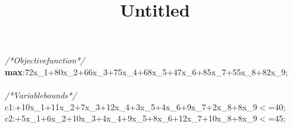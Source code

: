 \documentclass[a4paper, 10pt]{article}
\title{Untitled}
\newcommand\SPC{\hspace*{0.6em}}
\newcommand{\LPHighlighterAComment}[1]{\textit{\textcolor[rgb]{0,0.5,0}{#1}}}
\newcommand{\LPHighlighterAIdentifier}[1]{#1}
\newcommand{\LPHighlighterANumber}[1]{\textcolor[rgb]{0,0,0.5}{#1}}
\newcommand{\LPHighlighterAReservedWord}[1]{\textbf{#1}}
\newcommand{\LPHighlighterASpace}[1]{#1}
\newcommand{\LPHighlighterASymbol}[1]{#1}
\begin{document}
\begin{ttfamily}
\noindent
\LPHighlighterAComment{/*\SPC Objective\SPC function\SPC */}\\
\LPHighlighterAReservedWord{max}\LPHighlighterASymbol{:}\LPHighlighterASpace{\SPC }\LPHighlighterANumber{72x}\LPHighlighterAIdentifier{\_1}\LPHighlighterASymbol{+}\LPHighlighterANumber{80x}\LPHighlighterAIdentifier{\_2}\LPHighlighterASymbol{+}\LPHighlighterANumber{66x}\LPHighlighterAIdentifier{\_3}\LPHighlighterASymbol{+}\LPHighlighterANumber{75x}\LPHighlighterAIdentifier{\_4}\LPHighlighterASymbol{+}\LPHighlighterANumber{68x}\LPHighlighterAIdentifier{\_5}\LPHighlighterASymbol{+}\LPHighlighterANumber{47x}\LPHighlighterAIdentifier{\_6}\LPHighlighterASymbol{+}\LPHighlighterANumber{85x}\LPHighlighterAIdentifier{\_7}\LPHighlighterASymbol{+}\LPHighlighterANumber{55x}\LPHighlighterAIdentifier{\_8}\LPHighlighterASymbol{+}\LPHighlighterANumber{82x}\LPHighlighterAIdentifier{\_9}\LPHighlighterASymbol{;}\\
\\
\LPHighlighterAComment{/*\SPC Variable\SPC bounds\SPC */}\\
\LPHighlighterAIdentifier{c1}\LPHighlighterASymbol{:}\LPHighlighterASpace{\SPC }\LPHighlighterASymbol{+}\LPHighlighterANumber{10x}\LPHighlighterAIdentifier{\_1}\LPHighlighterASymbol{+}\LPHighlighterANumber{11x}\LPHighlighterAIdentifier{\_2}\LPHighlighterASymbol{+}\LPHighlighterANumber{7x}\LPHighlighterAIdentifier{\_3}\LPHighlighterASymbol{+}\LPHighlighterANumber{12x}\LPHighlighterAIdentifier{\_4}\LPHighlighterASymbol{+}\LPHighlighterANumber{3x}\LPHighlighterAIdentifier{\_5}\LPHighlighterASymbol{+}\LPHighlighterANumber{4x}\LPHighlighterAIdentifier{\_6}\LPHighlighterASymbol{+}\LPHighlighterANumber{9x}\LPHighlighterAIdentifier{\_7}\LPHighlighterASymbol{+}\LPHighlighterANumber{2x}\LPHighlighterAIdentifier{\_8}\LPHighlighterASymbol{+}\LPHighlighterANumber{8x}\LPHighlighterAIdentifier{\_9}\LPHighlighterASpace{\SPC }\LPHighlighterASymbol{$<$}\LPHighlighterASymbol{=}\LPHighlighterASpace{\SPC }\LPHighlighterANumber{40}\LPHighlighterASymbol{;}\\
\LPHighlighterAIdentifier{c2}\LPHighlighterASymbol{:}\LPHighlighterASpace{\SPC }\LPHighlighterASymbol{+}\LPHighlighterANumber{5x}\LPHighlighterAIdentifier{\_1}\LPHighlighterASymbol{+}\LPHighlighterANumber{6x}\LPHighlighterAIdentifier{\_2}\LPHighlighterASymbol{+}\LPHighlighterANumber{10x}\LPHighlighterAIdentifier{\_3}\LPHighlighterASymbol{+}\LPHighlighterANumber{4x}\LPHighlighterAIdentifier{\_4}\LPHighlighterASymbol{+}\LPHighlighterANumber{9x}\LPHighlighterAIdentifier{\_5}\LPHighlighterASymbol{+}\LPHighlighterANumber{8x}\LPHighlighterAIdentifier{\_6}\LPHighlighterASymbol{+}\LPHighlighterANumber{12x}\LPHighlighterAIdentifier{\_7}\LPHighlighterASymbol{+}\LPHighlighterANumber{10x}\LPHighlighterAIdentifier{\_8}\LPHighlighterASymbol{+}\LPHighlighterANumber{8x}\LPHighlighterAIdentifier{\_9}\LPHighlighterASpace{\SPC }\LPHighlighterASymbol{$<$}\LPHighlighterASymbol{=}\LPHighlighterASpace{\SPC }\LPHighlighterANumber{45}\LPHighlighterASymbol{;}\\

\end{ttfamily}
\end{document}
